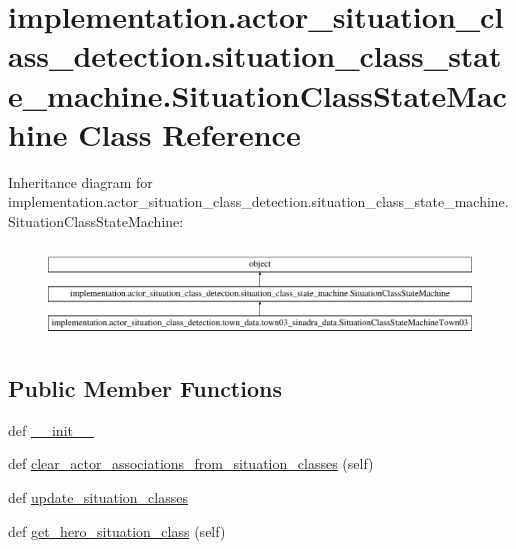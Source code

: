 \hypertarget{classimplementation_1_1actor__situation__class__detection_1_1situation__class__state__machine_1_1_situation_class_state_machine}{}\section{implementation.\+actor\+\_\+situation\+\_\+class\+\_\+detection.\+situation\+\_\+class\+\_\+state\+\_\+machine.\+Situation\+Class\+State\+Machine Class Reference}
\label{classimplementation_1_1actor__situation__class__detection_1_1situation__class__state__machine_1_1_situation_class_state_machine}
Inheritance diagram for implementation.\+actor\+\_\+situation\+\_\+class\+\_\+detection.\+situation\+\_\+class\+\_\+state\+\_\+machine.\+Situation\+Class\+State\+Machine\+:\begin{figure}[H]
\begin{center}
\leavevmode
\includegraphics[height=2.503726cm]{classimplementation_1_1actor__situation__class__detection_1_1situation__class__state__machine_1_1_situation_class_state_machine}
\end{center}
\end{figure}
\subsection*{Public Member Functions}
\begin{DoxyCompactItemize}
\item 
def \hyperlink{classimplementation_1_1actor__situation__class__detection_1_1situation__class__state__machine_1_1_situation_class_state_machine_ae25ddb59e6a7d8a1ebfdd1e1441b5755}{\+\_\+\+\_\+init\+\_\+\+\_\+}
\item 
def \hyperlink{classimplementation_1_1actor__situation__class__detection_1_1situation__class__state__machine_1_1_situation_class_state_machine_ad6e1f4d300138b8c8d1a092bf1628b49}{clear\+\_\+actor\+\_\+associations\+\_\+from\+\_\+situation\+\_\+classes} (self)
\item 
def \hyperlink{classimplementation_1_1actor__situation__class__detection_1_1situation__class__state__machine_1_1_situation_class_state_machine_ab1271848fb25a8644f34b209d4ac9ed6}{update\+\_\+situation\+\_\+classes}
\item 
def \hyperlink{classimplementation_1_1actor__situation__class__detection_1_1situation__class__state__machine_1_1_situation_class_state_machine_a7a4a9a103a8526903fb4912a224b7cdd}{get\+\_\+hero\+\_\+situation\+\_\+class} (self)
\end{DoxyCompactItemize}
